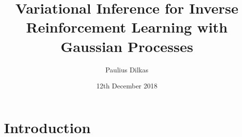 \documentclass{mprop}
\theoremstyle{definition}
\begin{document}
\title{Variational Inference for Inverse Reinforcement Learning with Gaussian
  Processes}
\author{Paulius Dilkas}
\date{12th December 2018}
\maketitle
\tableofcontents
\newpage

\newcommand{\Kuu}{\mathbf{K}_{\mathbf{u},\mathbf{u}}}
\newcommand{\Krr}{\mathbf{K}_{\mathbf{r},\mathbf{r}}}
\newcommand{\Kru}{\mathbf{K}_{\mathbf{r},\mathbf{u}}}

\newcommand{\DKL}{D_{\mathrm{KL}}}

\newcommand{\pfull}{p(\mathcal{D}, \bm\lambda, \mathbf{X_u}, \mathbf{u}, \mathbf{r})}
\newcommand{\pfullS}{p(\mathcal{D}, \bm\lambda_s, \mathbf{X_u}, \mathbf{u}_s, \mathbf{r}_s)}
\newcommand{\posterior}{p(\bm\lambda, \mathbf{u}, \mathbf{r} | \mathcal{D}, \mathbf{X_u})}
\newcommand{\approximation}{q_{\bm\nu}(\bm\lambda, \mathbf{u}, \mathbf{r})}
\newcommand{\approximationS}{q_{\bm\nu}(\bm\lambda_s, \mathbf{u}_s, \mathbf{r}_s)}

\newcommand{\Eq}{\mathbb{E}_{(\bm\lambda, \mathbf{u}, \mathbf{r}) \sim \approximation}}

\section{Introduction}
\end{document}
